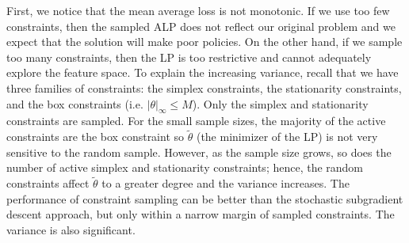 \documentclass[11pt]{article}
\begin{document}
First, we notice that the mean average loss is not monotonic. If we use too few constraints, then the sampled ALP does not reflect our original problem and we expect that the solution will make poor policies. On the other hand, if we sample too many constraints, then the LP is too restrictive and cannot adequately explore the feature space. To explain the increasing variance, recall that we have three families of constraints: the simplex constraints, the stationarity constraints, and the box constraints (i.e. $|\theta|_\infty\leq M$). Only the simplex and stationarity constraints are sampled. For the small sample sizes, the majority of the active constraints are the box constraint so $\tilde\theta$ (the minimizer of the LP) is not very sensitive to the random sample. However, as the sample size grows, so does the number of active simplex and stationarity constraints; hence, the random constraints affect  $\tilde\theta$ to a greater degree and the variance increases. The performance of constraint sampling can be better than the stochastic subgradient descent approach, but only within a narrow margin of sampled constraints. The variance is also significant.
\fi

\end{document}
